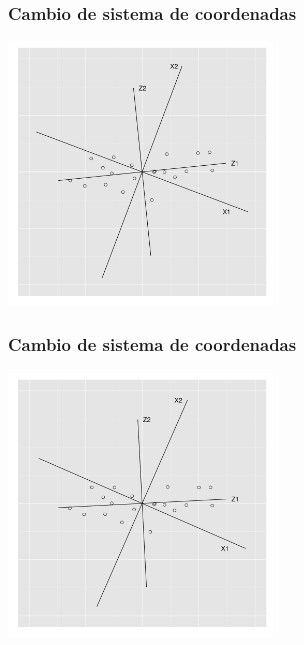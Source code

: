 \documentclass{beamer}
\begin{document}
\begin{frame}\frametitle{Cambio de sistema de coordenadas}
   \begin{overlayarea}{\textwidth}{8cm} 
 \begin{center}
   \includegraphics[height=7cm]{x1x2z1z2rotated08.png}
 \end{center}
   \end{overlayarea}
 \end{frame}
\begin{frame}\frametitle{Cambio de sistema de coordenadas}
   \begin{overlayarea}{\textwidth}{8cm} 
 \begin{center}
   \includegraphics[height=7cm]{x1x2z1z2rotated09.png}
 \end{center}
   \end{overlayarea}
 \end{frame}
\end{document}
